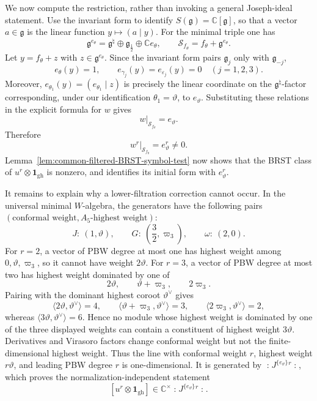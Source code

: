 \documentclass[11pt,reqno]{amsart}
\theoremstyle{definition}
\theoremstyle{remark}
\begin{document}
We now compute the restriction, rather than invoking a general Joseph-ideal
statement.  Use the invariant form to identify
\(S(\mathfrak g)=\mathbb C[\mathfrak g]\), so that a vector
\(a\in\mathfrak g\) is the linear function \(y\mapsto(a\mid y)\).  For the
minimal triple one has
\begin{equation*}
  \mathfrak g^{e_\theta}
  =\mathfrak g^\natural\oplus\mathfrak g_{\frac12}
   \oplus\mathbb C e_\theta,
  \qquad
  \mathcal S_{f_\theta}=f_\theta+\mathfrak g^{e_\theta}.
\end{equation*}
Let \(y=f_\theta+z\) with \(z\in\mathfrak g^{e_\theta}\).  Since the invariant
form pairs \(\mathfrak g_j\) only with \(\mathfrak g_{-j}\),
\begin{equation*}
  e_\theta(y)=1,
  \qquad
  e_{\gamma_j}(y)=e_{\varepsilon_j}(y)=0
  \quad(j=1,2,3).
\end{equation*}
Moreover, \(e_{\theta_1}(y)=(e_{\theta_1}\mid z)\) is precisely the linear
coordinate on the \(\mathfrak g^\natural\)-factor corresponding, under our
identification \(\theta_1=\vartheta\), to \(e_\vartheta\).  Substituting these
relations in the explicit formula for \(w\) gives
\begin{equation*}
  \left.w\right|_{\mathcal S_{f_\theta}}=e_\vartheta.
\end{equation*}
Therefore
\begin{equation*}
  \left.w^r\right|_{\mathcal S_{f_\theta}}
  =e_\vartheta^r\neq0.
\end{equation*}
Lemma~\ref{lem:common-filtered-BRST-symbol-test} now shows that the BRST
class of $u^r\otimes\mathbf1_{\mathrm{gh}}$ is nonzero, and identifies its
initial form with $e_\vartheta^r$.

It remains to explain why a lower-filtration correction cannot occur.  In the
universal minimal \(W\)-algebra, the generators have the following pairs
\((\text{conformal weight},A_5\text{-highest weight})\):
\[
  J:\ (1,\vartheta),
  \qquad
  G:\ \left(\frac32,\varpi_3\right),
  \qquad
  \omega:\ (2,0).
\]
For \(r=2\), a vector of PBW degree at most one has highest weight among
\(0,\vartheta,\varpi_3\), so it cannot have weight \(2\vartheta\).  For \(r=3\),
a vector of PBW degree at most two has highest weight dominated by one of
\[
  2\vartheta,
  \qquad
  \vartheta+\varpi_3,
  \qquad
  2\varpi_3.
\]
Pairing with the dominant highest coroot \(\vartheta^\vee\) gives
\[
 \langle2\vartheta,\vartheta^\vee\rangle=4,
 \qquad
 \langle\vartheta+\varpi_3,\vartheta^\vee\rangle=3,
 \qquad
 \langle2\varpi_3,\vartheta^\vee\rangle=2,
\]
whereas \(\langle3\vartheta,\vartheta^\vee\rangle=6\).  Hence no module whose
highest weight is dominated by one of the three displayed weights can contain a
constituent of highest weight \(3\vartheta\).  Derivatives and Virasoro factors
change conformal weight but not the finite-dimensional highest weight.  Thus the line with conformal weight
\(r\), highest weight \(r\vartheta\), and leading PBW degree \(r\) is
one-dimensional.  It is generated by
\(\mathopen{:}J^{\{e_\vartheta\}}{}^r\mathclose{:}\), which proves the
normalization-independent statement
\[
  [u^r\otimes\mathbf1_{\mathrm{gh}}]
  \in
  \mathbb C^\times
  \mathopen{:}J^{\{e_\vartheta\}}{}^r\mathclose{:}.
\]
\end{document}
